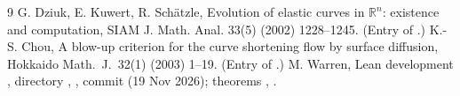 \documentclass[11pt]{article}
\begin{document}
\ifdefined\stepmain\else
\begin{thebibliography}{9}
 G. Dziuk, E. Kuwert, R. Sch\"atzle, Evolution of elastic curves in $\mathbb R^n$: existence and computation, SIAM J. Math. Anal. 33(5) (2002) 1228--1245. (Entry  of .)
 K.-S. Chou, A blow-up criterion for the curve shortening flow by surface diffusion, Hokkaido Math.\ J.\ 32(1) (2003) 1--19. (Entry  of .)
 M. Warren, Lean development , directory , , commit  (19 Nov 2026); theorems , .
\end{thebibliography}
\end{document}
